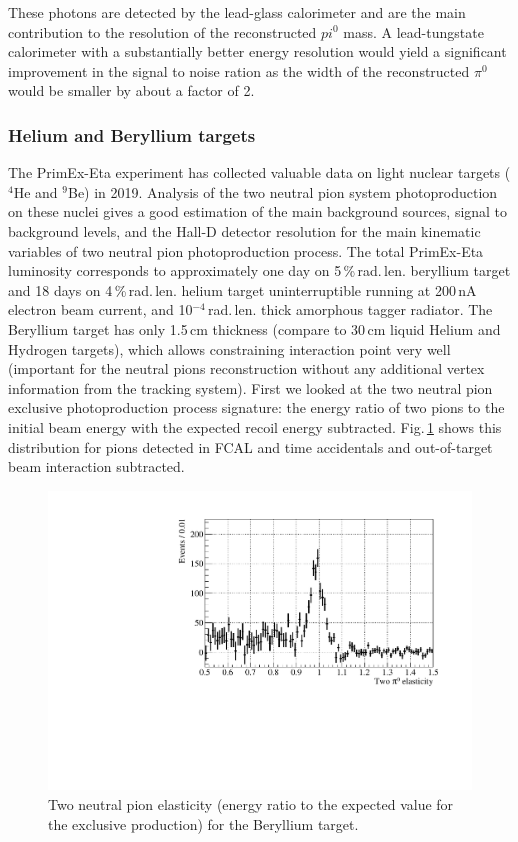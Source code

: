 These photons are detected by the lead-glass calorimeter and are the
main contribution to the resolution of the reconstructed $pi^{0}$
mass. A lead-tungstate calorimeter with a substantially better energy
resolution would yield a significant improvement in the signal to
noise ration as the width of the reconstructed $\pi^{0}$ would be
smaller by about a factor of 2.
\subsubsection*{Helium and Beryllium targets}
The PrimEx-Eta experiment has collected valuable data on light nuclear targets ($^4$He and $^9$Be) in 2019. Analysis of the two neutral pion system photoproduction on these nuclei gives a good estimation of the main background sources, signal to background levels, and the Hall-D detector resolution for the main kinematic variables of two neutral pion photoproduction process. The total PrimEx-Eta luminosity corresponds to approximately one day on 5$\,$\%$\,$rad.$\,$len. beryllium target and 18 days on 4$\,$\%$\,$rad.$\,$len. helium target uninterruptible running at 200$\,$nA electron beam current, and 10$^{-4}\,$rad.$\,$len. thick amorphous tagger radiator. The Beryllium target has only 1.5$\,$cm thickness (compare to 30$\,$cm liquid Helium and Hydrogen targets), which allows constraining interaction point very well (important for the neutral pions reconstruction without any additional vertex information from the tracking system).
First we looked at the two neutral pion exclusive photoproduction process signature: the energy ratio of two pions to the initial beam energy with the expected recoil energy subtracted. Fig.$\,$\ref{fig:pi0elastbe} shows this distribution for pions detected in FCAL and time accidentals and out-of-target beam interaction subtracted.
\begin{figure}[!h]
\centering\includegraphics[width=4.75in]{figures/be_elast1.pdf}
\caption{Two neutral pion elasticity (energy ratio to the expected value for the exclusive production) for the Beryllium target.
\label{fig:pi0elastbe}}
\end{figure}
